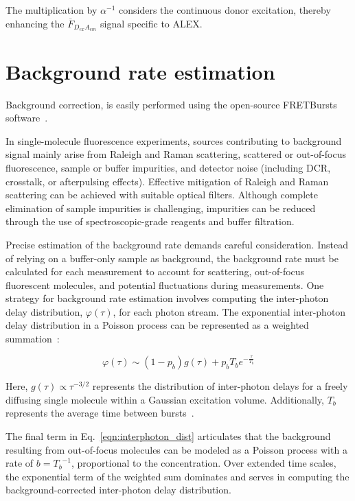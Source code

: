 The multiplication by $\alpha^{-1}$ considers the continuous donor excitation, thereby enhancing the $\overline{F}_{D_{ex}A_{em}}$ signal specific to \ac{ALEX}.


\section{Background rate estimation}
\label{sec:background_rate_apdx}

Background correction, is easily performed using the open-source FRETBursts software~\cite{ingargiola_PLOS1_2016}.

In single-molecule fluorescence experiments, sources contributing to background signal mainly arise from Raleigh and Raman scattering, scattered or out-of-focus fluorescence, sample or buffer impurities, and detector noise (including \ac{DCR}, crosstalk, or afterpulsing effects). 
Effective mitigation of Raleigh and Raman scattering can be achieved with suitable optical filters. 
Although complete elimination of sample impurities is challenging, impurities can be reduced through the use of spectroscopic-grade reagents and buffer filtration.

Precise estimation of the background rate demands careful consideration. Instead of relying on a buffer-only sample as background, the background rate must be calculated for each measurement to account for scattering, out-of-focus fluorescent molecules, and potential fluctuations during measurements. 
One strategy for background rate estimation involves computing the inter-photon delay distribution, $\varphi(\tau)$, for each photon stream. 
The exponential inter-photon delay distribution in a Poisson process can be represented as a weighted summation~\cite{gopich_JCP_2006}:

\begin{equation}
\label{eqn:interphoton_dist}
\varphi\left(\tau\right)\sim \left(1-p_b\right)g\left(\tau\right)+p_bT_be^{-\frac{\tau}{T_b}} 
\end{equation}

\noindent
Here, $g(\tau) \propto \tau^{-3/2}$ represents the distribution of inter-photon delays for a freely diffusing single molecule within a Gaussian excitation volume. 
Additionally, $T_b$ represents the average time between bursts~\cite{gopich_JCP_2006}.

The final term in Eq.~\ref{eqn:interphoton_dist} articulates that the background resulting from out-of-focus molecules can be modeled as a Poisson process with a rate of $b={T_b}^{-1}$, proportional to the concentration. 
Over extended time scales, the exponential term of the weighted sum dominates and serves in computing the background-corrected inter-photon delay distribution.


